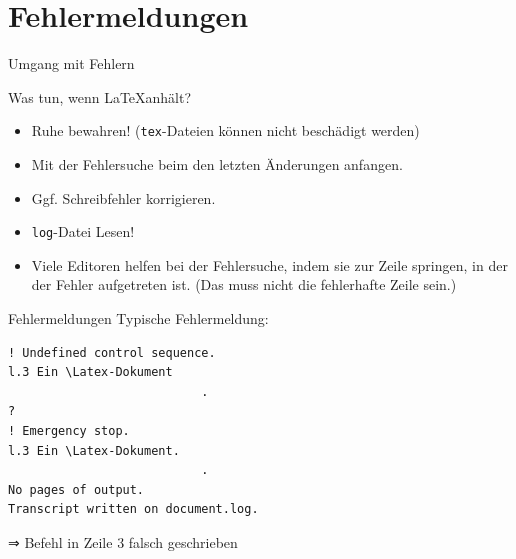 \documentclass[
	vorläufig=true,
	datum=2016-10-28,
	titel={Allgemeine Formatierung und Pakete},
	web=true,
]{../tex/latexkurs-slides}
\begin{document}
\section{Fehlermeldungen}
\begin{frame}[t]{Umgang mit Fehlern}
	\begin{block}{Was tun, wenn \LaTeX anhält?}
		\begin{itemize}
			\item Ruhe bewahren! (\texttt{tex}-Dateien können nicht beschädigt werden)
			\item Mit der Fehlersuche beim den letzten Änderungen anfangen.
			\item Ggf. Schreibfehler korrigieren.
			\item \texttt{log}-Datei Lesen!
			\item Viele Editoren helfen bei der Fehlersuche, indem sie zur Zeile springen, in der der Fehler aufgetreten ist. (Das muss nicht die fehlerhafte Zeile sein.)
		\end{itemize}
	\end{block}
\end{frame}

\begin{frame}[fragile,t]{Fehlermeldungen}
Typische Fehlermeldung:
\begin{lstlisting}
! Undefined control sequence.
l.3 Ein \Latex-Dokument
                           .
? 
! Emergency stop.
l.3 Ein \Latex-Dokument.
                           .
No pages of output.
Transcript written on document.log.
\end{lstlisting}
⇒ Befehl in Zeile 3 falsch geschrieben
\end{frame}

\end{document}
